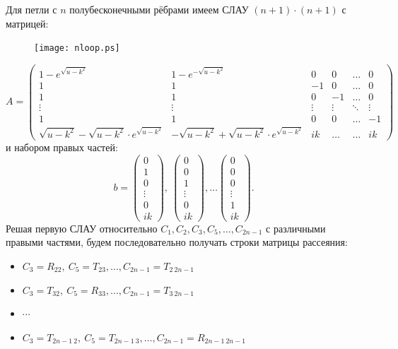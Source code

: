\documentclass[a4 paper, 12 pt]{extarticle}
\begin{document}
   Для петли с $n$ полубесконечными рёбрами имеем СЛАУ $(n+1)\cdot (n+1)$ с матрицей:
   \begin{figure}[!htb]
   	\centering
   	\texttt{[image: nloop.ps]}
   \end{figure}
   \[ A = \left(\begin{smallmatrix}
   1-e^{\sqrt{u-k^2}} & 1-e^{-\sqrt{u-k^2}} & 0 & 0 & \ldots & 0 \\
   1 & 1 & -1  & 0 & \ldots & 0 \\
   1 & 1 & 0  & -1 & \ldots & 0 \\
   \vdots & \vdots & \vdots  & \vdots & \ddots & \vdots \\
   1 & 1 & 0  & 0 & \ldots & -1 \\
   \sqrt{u-k^2}-\sqrt{u-k^2} \cdot e^{\sqrt{u-k^2}} & -\sqrt{u-k^2}+\sqrt{u-k^2} \cdot e^{\sqrt{u-k^2}} & ik & \ldots & \ldots & ik
   \end{smallmatrix}\right)\]
   и набором правых частей:
   \[b = \left(\begin{smallmatrix}
   0 \\
   1 \\
   0 \\
   \vdots \\
   0 \\
   ik
   \end{smallmatrix}\right), \ 
   \left(\begin{smallmatrix}
   0 \\
   0 \\
   1 \\
   \vdots \\
   0 \\
   ik
   \end{smallmatrix}\right), \ldots
   \left(\begin{smallmatrix}
   0 \\
   0 \\
   0 \\
   \vdots \\
   1 \\
   ik
   \end{smallmatrix}\right).
   \]
   Решая первую СЛАУ относительно $C_1, C_2, C_3, C_5, \ldots, C_{2n-1}$ с различными правыми частями, будем последовательно получать строки матрицы рассеяния: 
   
   \begin{itemize}
   	\item $C_3 = R_{22}, \ C_5 = T_{23}, \ldots, C_{2n-1} = T_{2 \ 2n-1}$ 
   	\item $C_3 = T_{32}, \ C_5 = R_{33}, \ldots, C_{2n-1} = T_{3 \ 2n-1} $
   	\item $\cdots$ 
   	\item $C_3 = T_{2n-1 \ 2}, \ C_5 = T_{2n-1 \ 3}, \ldots, C_{2n-1} = R_{2n-1 \  2n-1}$ 
   \end{itemize}
    
\end{document}
